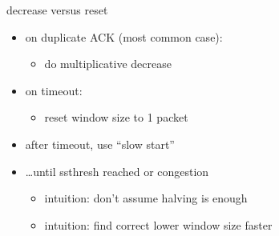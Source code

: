 \begin{frame}{decrease versus reset}
    \begin{itemize}
    \item on duplicate ACK (most common case):
        \begin{itemize}
        \item do multiplicative decrease
        \end{itemize}
    \item on timeout:
        \begin{itemize}
        \item reset window size to 1 packet
        \end{itemize}
    \vspace{.5cm}
    \item after timeout, use ``slow start''
    \item \ldots until ssthresh reached or congestion
        \begin{itemize}
        \item intuition: don't assume halving is enough
        \item intuition: find correct lower window size faster
        \end{itemize}
    \end{itemize}
\end{frame}
